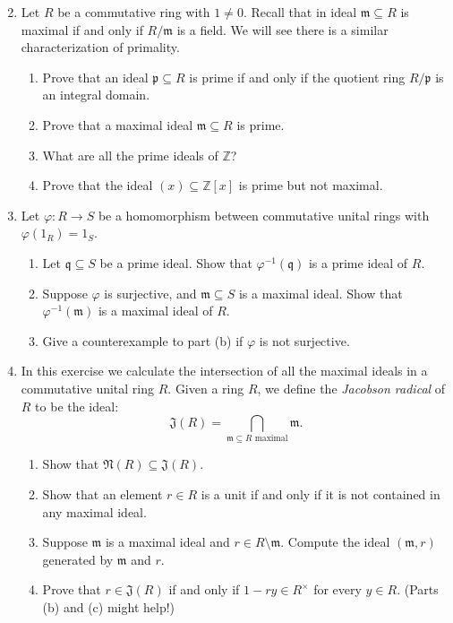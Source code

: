 \documentclass[11pt]{article}
\newcommand{\bZ}{\mathbb{Z}}
\newcommand{\fN}{\mathfrak{N}}
\newcommand{\fJ}{\mathfrak{J}}
\newcommand{\fp}{\mathfrak{p}}
\newcommand{\fq}{\mathfrak{q}}
\newcommand{\fm}{\mathfrak{m}}
\begin{document}
\begin{enumerate}
\setcounter{enumi}{1}
\item{Let $R$ be a commutative ring with $1\not=0$.  Recall that in ideal $\fm\subseteq R$ is maximal if and only if $R/\fm$ is a field.  We will see there is a similar characterization of primality.
\begin{enumerate}
\item{Prove that an ideal $\fp\subseteq R$ is prime if and only if the quotient ring $R/\fp$ is an integral domain.}
\item{Prove that a maximal ideal $\fm\subseteq R$ is prime.}
\item{What are all the prime ideals of $\bZ$?}
\item{Prove that the ideal $(x)\subseteq\bZ[x]$ is prime but not maximal.}
\end{enumerate}
}
  \item{
  Let $\varphi:R\to S$ be a homomorphism between commutative unital rings with $\varphi(1_R)=1_S$.
  \begin{enumerate}
    \item{
    Let $\fq\subseteq S$ be a prime ideal.  Show that $\varphi^{-1}(\fq)$ is a prime ideal of $R$.
    }
    \item{
    Suppose $\varphi$ is surjective, and $\fm\subseteq S$ is a maximal ideal.  Show that $\varphi^{-1}(\fm)$ is a maximal ideal of $R$.
    }
    \item{
    Give a counterexample to part (b) if $\varphi$ is not surjective.
    }
  \end{enumerate}
  }
  \item{
  In this exercise we calculate the intersection of all the maximal ideals in a commutative unital ring $R$.  Given a ring $R$, we define the \textit{Jacobson radical} of $R$ to be the ideal:
  \[\fJ(R) = \bigcap_{\fm\subseteq R\text{ maximal}}\fm.\]
  \begin{enumerate}
    \item{
    Show that $\fN(R)\subseteq\fJ(R)$.
    }
    \item{
    Show that an element $r\in R$ is a unit if and only if it is not contained in any maximal ideal.
    }
    \item{
    Suppose $\fm$ is a maximal ideal and $r\in R\setminus\fm$.  Compute the ideal $(\fm,r)$ generated by $\fm$ and $r$.
    }
    \item{
    Prove that $r\in\fJ(R)$ if and only if $1-ry\in R^\times$ for every $y\in R$.  (Parts (b) and (c) might help!)
    }

\end{enumerate}}
\end{enumerate}
\end{document}
